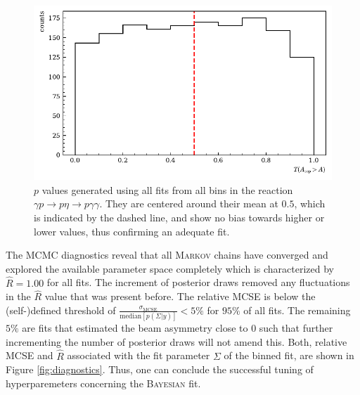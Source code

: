 \begin{figure}[htbp]
	\centering
	\includegraphics[width=\linewidth]{../bayes/realdeal/plots/pval_hist.pdf}
	\caption{$p$ values generated using all fits from all bins in the reaction $\gamma p\to p\eta\to p\gamma\gamma$. They are centered around their mean at $0.5$, which is indicated by the dashed line, and show no bias towards higher or lower values, thus confirming an adequate fit.}
	\label{fig:pvals}
\end{figure}
The MCMC diagnostics reveal that all \textsc{Markov} chains have converged and explored the available parameter space completely which is characterized by $\widehat{R}=1.00$ for all fits. The increment of posterior draws removed any fluctuations in the $\widehat{R}$ value that was present before. The relative MCSE is below the (self-)defined threshold of $\frac{\sigma_\text{MCSE}}{\text{median}\left[p\left(\Sigma|y\right)\right]}<5\%$ for $95\%$ of all fits. The remaining $5\%$ are fits that estimated the beam asymmetry close to $0$ such that further incrementing the number of posterior draws will not amend this. Both, relative MCSE and $\widehat{R}$ associated with the fit parameter $\Sigma$ of the binned fit, are shown in Figure \ref{fig:diagnostics}. Thus, one can conclude the successful tuning of hyperparemeters concerning the \textsc{Bayesian} fit. 
